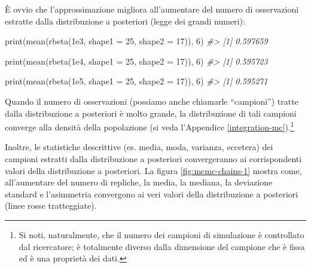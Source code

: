 \documentclass[
  10pt,
  italian,
  a4paper,
  extrafontsizes,onecolumn,openright
  ]{memoir}
\newenvironment{Shaded}{\begin{snugshade}}{\end{snugshade}}
\newcommand{\AttributeTok}[1]{\textcolor[rgb]{0.77,0.63,0.00}{#1}}
\newcommand{\CommentTok}[1]{\textcolor[rgb]{0.56,0.35,0.01}{\textit{#1}}}
\newcommand{\DecValTok}[1]{\textcolor[rgb]{0.00,0.00,0.81}{#1}}
\newcommand{\FloatTok}[1]{\textcolor[rgb]{0.00,0.00,0.81}{#1}}
\newcommand{\FunctionTok}[1]{\textcolor[rgb]{0.00,0.00,0.00}{#1}}
\newcommand{\NormalTok}[1]{#1}
\begin{document}
\noindent
È ovvio che l'approssimazione migliora all'aumentare del numero di osservazioni estratte dalla distribuzione a posteriori (legge dei grandi numeri):

\begin{Shaded}
\begin{Highlighting}[]
\FunctionTok{print}\NormalTok{(}\FunctionTok{mean}\NormalTok{(}\FunctionTok{rbeta}\NormalTok{(}\FloatTok{1e3}\NormalTok{, }\AttributeTok{shape1 =} \DecValTok{25}\NormalTok{, }\AttributeTok{shape2 =} \DecValTok{17}\NormalTok{)), }\DecValTok{6}\NormalTok{)}
\CommentTok{\#\textgreater{} [1] 0.597659}
\end{Highlighting}
\end{Shaded}

\begin{Shaded}
\begin{Highlighting}[]
\FunctionTok{print}\NormalTok{(}\FunctionTok{mean}\NormalTok{(}\FunctionTok{rbeta}\NormalTok{(}\FloatTok{1e4}\NormalTok{, }\AttributeTok{shape1 =} \DecValTok{25}\NormalTok{, }\AttributeTok{shape2 =} \DecValTok{17}\NormalTok{)), }\DecValTok{6}\NormalTok{)}
\CommentTok{\#\textgreater{} [1] 0.595723}
\end{Highlighting}
\end{Shaded}

\begin{Shaded}
\begin{Highlighting}[]
\FunctionTok{print}\NormalTok{(}\FunctionTok{mean}\NormalTok{(}\FunctionTok{rbeta}\NormalTok{(}\FloatTok{1e5}\NormalTok{, }\AttributeTok{shape1 =} \DecValTok{25}\NormalTok{, }\AttributeTok{shape2 =} \DecValTok{17}\NormalTok{)), }\DecValTok{6}\NormalTok{)}
\CommentTok{\#\textgreater{} [1] 0.595271}
\end{Highlighting}
\end{Shaded}

\noindent
Quando il numero di osservazioni (possiamo anche chiamarle ``campioni'') tratte dalla distribuzione a posteriori è molto grande, la distribuzione di tali campioni converge alla densità della popolazione (si veda l'Appendice \ref{integration-mc}).\footnote{Si noti, naturalmente, che il numero dei campioni di simulazione è controllato dal ricercatore; è totalmente diverso dalla dimensione del campione che è fissa ed è una proprietà dei dati.}

Inoltre, le statistiche descrittive (es. media, moda, varianza, eccetera) dei campioni estratti dalla distribuzione a posteriori convergeranno ai corrispondenti valori della distribuzione a posteriori. La figura \ref{fig:mcmc-chains-1} mostra come, all'aumentare del numero di repliche, la media, la mediana, la deviazione standard e l'asimmetria convergono ai veri valori della distribuzione a posteriori (linee rosse tratteggiate).
\end{document}

